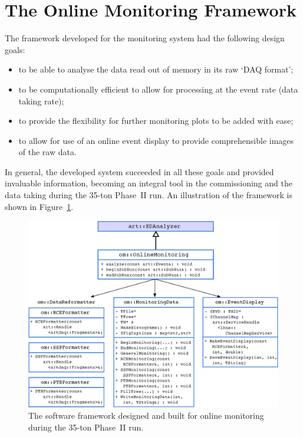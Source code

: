
\section{The Online Monitoring Framework}\label{sec:OnlineMonitoring}

The framework developed for the monitoring system had the following design goals:
\begin{itemize}
\item to be able to analyse the data read out of memory in its raw `DAQ format';
\item to be computationally efficient to allow for processing at the event rate (data taking rate);
\item to provide the flexibility for further monitoring plots to be added with ease;
\item to allow for use of an online event display to provide comprehensible images of the raw data.
\end{itemize}
In general, the developed system succeeded in all these goals and provided invaluable information, becoming an integral tool in the commissioning and the data taking during the 35-ton Phase~II run.  An illustration of the framework is shown in Figure~\ref{fig:OnlineMonitoringFramework}.

\begin{figure}
  \centering
  \includegraphics[width=12cm]{softwareFramework.eps}
  \caption[The software framework designed and built for online monitoring during the 35-ton Phase~II run.]{The software framework designed and built for online monitoring during the 35-ton Phase~II run.}
  \label{fig:OnlineMonitoringFramework}
\end{figure}

